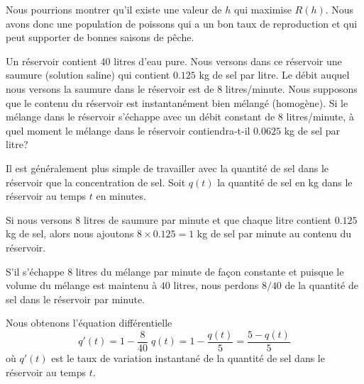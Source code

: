 {\begin{rmk}[\life]
Nous pourrions montrer qu'il existe une valeur de $h$ qui maximise $R(h)$.
Nous avons donc une population de poissons qui a un bon taux de reproduction
et qui peut supporter de bonnes saisons de pêche.
\end{rmk}




\begin{egg}[\eng]
Un réservoir contient $40$ litres d'eau pure.  Nous versons dans ce
réservoir une saumure (solution saline) qui contient $0.125$ kg de sel
par litre.  Le débit auquel nous versons la saumure dans le réservoir est
de $8$ litres/minute.  Nous supposons que le contenu du réservoir est
instantanément bien mélangé (homogène).  Si le mélange dans le
réservoir s'échappe avec un débit constant de $8$ litres/minute, à
quel moment le mélange dans le réservoir contiendra-t-il $0.0625$ kg
de sel par litre?

Il est généralement plus simple de travailler avec la quantité de sel
dans le réservoir que la concentration de sel.  Soit $q(t)$ la quantité
de sel en kg dans le réservoir au temps $t$ en minutes.

Si nous versons $8$ litres de saumure par minute et que chaque litre
contient $0.125$ kg de sel, alors nous ajoutons $8\times 0.125 =1$ kg de
sel par minute au contenu du réservoir.

S'il s'échappe $8$ litres du mélange par minute de façon constante et
puisque le volume du mélange est maintenu à $40$ litres, nous perdons
$8/40$ de la quantité de sel dans le réservoir par minute.

Nous obtenons l'équation différentielle
\[
q'(t) = 1 - \frac{8}{40} \; q(t) = 1 - \frac{q(t)}{5} = \frac{5-q(t)}{5}
\]
où $q'(t)$ est le taux de variation instantané de la quantité de sel
dans le réservoir au temps $t$.


\end{egg}}
